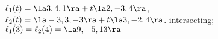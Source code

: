 {$\ell_1(t) = \la 3,4,1\ra + t\la 2,-3,4\ra$,\\
$\ell_2(t) = \la -3,3,-3\ra + t\la 3,-2,4\ra$.
}
{intersecting; $\ell_1(3) = \ell_2(4) = \la 9,-5,13\ra$
}

